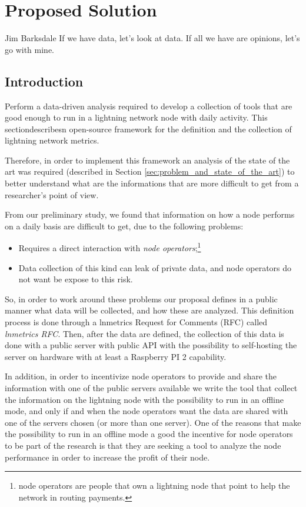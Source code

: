 \chapter{Proposed Solution}

\begin{chapquote}{Jim Barksdale}
If we have data, let’s look at data. If all we have are opinions, let’s go with mine.
\end{chapquote}

\section{Introduction}

Perform a data-driven analysis required to develop a collection of tools
that are good enough to run in a lightning network node with daily activity. 
This sectiondescribesn open-source framework for the definition and 
the collection of lightning network metrics.

Therefore, in order to implement this framework an analysis of the state 
of the art was required (described in Section \ref{sec:problem_and_state_of_the_art})
to better understand what are the informations that are more difficult 
to get from a researcher's point of view.

From our preliminary study, we found that information on how a node performs 
on a daily basis are difficult to get, due to the following problems:
\begin{itemize}
    \item Requires a direct interaction with \emph{node operators};\footnote{node operators are people that own a 
        lightning node that point to help the network in routing payments.}
    \item Data collection of this kind can leak of private data, and node operators
        do not want be expose to this risk.
\end{itemize}

So, in order to work around these problems our proposal defines in a 
public manner what data will be collected, and how these are analyzed. This 
definition process is done through a lnmetrics Request for Comments (RFC) 
called \emph{lnmetrics RFC}. Then, after the data are defined, the collection 
of this data is done with a public server with public API with the possibility 
to self-hosting the server on hardware with at least a Raspberry PI 2 capability.

In addition, in order to incentivize node operators to provide and share the 
information with one of the public servers available we write the tool that 
collect the information on the lightning node with the possibility to run 
in an offline mode, and only if and when the node operators want the data 
are shared with one of the servers chosen (or more than one server).
One of the reasons that make the possibility to run in an offline mode a good
the incentive for node operators to be part of the research is that they 
are seeking a tool to analyze the node performance in order to increase the profit of
their node.

